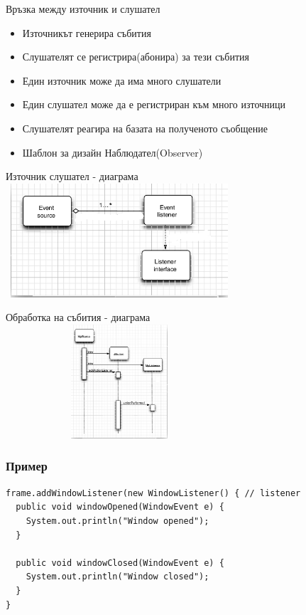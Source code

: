 \documentclass{beamer}
\begin{document}
\begin{frame}{Връзка между източник и слушател}
  \transdissolve
  \begin{itemize}
  \item Източникът генерира събития
  \item Слушателят се регистрира(абонира) за тези събития
  \item Един източник може да има много слушатели
  \item Един слушател може да е регистриран към много източници
  \item Слушателят реагира на базата на полученото съобщение
  \item Шаблон за дизайн Наблюдател(Observer)
  \end{itemize}
\end{frame}


\begin{frame}{Източник слушател - диаграма}
  \transdissolve
  \includegraphics[width=320px,height=160px]{images/event_source.png}  
\end{frame}

\begin{frame}{Обработка на събития - диаграма}
  \transdissolve
  \includegraphics[width=320px,height=160px]{images/event_handling.png}  
\end{frame}

\begin{frame}[fragile]
  \frametitle{Пример}
  \transdissolve
\begin{lstlisting}
frame.addWindowListener(new WindowListener() { // listener
  public void windowOpened(WindowEvent e) {
    System.out.println("Window opened"); 
  }
  
  public void windowClosed(WindowEvent e) {
    System.out.println("Window closed"); 
  }
}

\end{lstlisting}
\end{frame}
\end{document}
